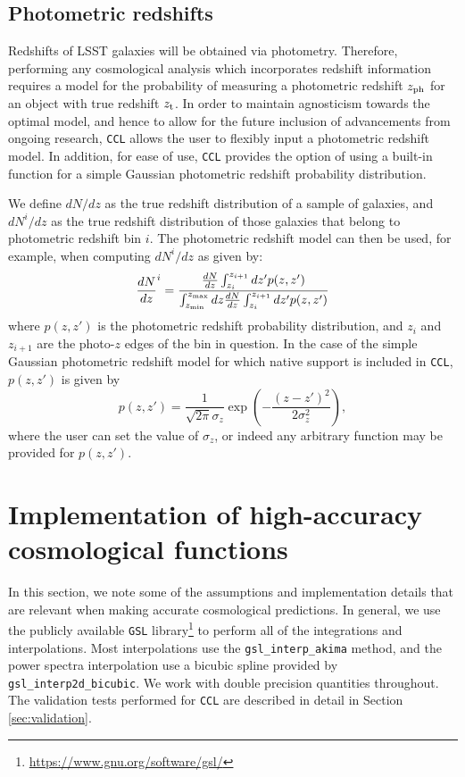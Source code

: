 \documentclass[\docopts]{\docclass}
\newcommand{\ccl}{{\tt CCL}\xspace}
\begin{document}
\subsection{Photometric redshifts}

Redshifts of LSST galaxies will be obtained via photometry. Therefore, performing any cosmological analysis which incorporates redshift information requires a model for the probability of measuring a photometric redshift $z_{\rm ph}$ for an object with true redshift $z_{\rm t}$.  In order to maintain agnosticism towards the optimal model, and hence to allow for the future inclusion of advancements from ongoing research, \ccl allows the user to flexibly input a photometric redshift model. In addition, for ease of use, \ccl provides the option of using a built-in function for a simple Gaussian photometric redshift probability distribution.

We define $dN/dz$ as the true redshift distribution of a sample of galaxies, and $dN^i/dz$ as the true redshift distribution of those galaxies that belong to photometric redshift bin $i$. The photometric redshift model can then be used, for example, when computing $dN^i/dz$ as given by:
\begin{equation}
\frac{dN}{dz}^i = \frac{\frac{dN}{dz}\int_{z_i}^{z_{i+1}} dz' p(z,z')}{\int_{z_{\rm min}}^{z_{\rm max}}dz \frac{dN}{dz} \int_{z_i}^{z_{i+1}}dz' p(z, z')}
\label{photoz}
\end{equation}
where $p(z,z')$ is the photometric redshift probability distribution, and $z_{i}$ and $z_{i+1}$ are the photo-$z$ edges of the bin in question. In the case of the simple Gaussian photometric redshift model for which native support is included in \ccl , $p(z, z')$ is given by
\begin{equation}
p(z,z') = \frac{1}{\sqrt{2 \pi}\sigma_z} \exp\left(-\frac{(z-z')^2}{2\sigma_z^2}\right),
\label{pz_gauss}
\end{equation}
where the user can set the value of $\sigma_z$, or indeed any arbitrary function may be provided for $p(z,z')$.

\section{Implementation of high-accuracy cosmological functions}
\label{sec:implement}

In this section, we note some of the assumptions and implementation details that are relevant when making accurate cosmological predictions. In general, we use the publicly available {\tt GSL} library\footnote{\url{https://www.gnu.org/software/gsl/}} to perform all of the integrations and interpolations. Most interpolations use the {\tt gsl\_interp\_akima} method, and the power spectra interpolation use a bicubic spline provided by {\tt gsl\_interp2d\_bicubic}. We work with double precision quantities throughout. The validation tests performed for {\tt CCL} are described in detail in Section \ref{sec:validation}.
\end{document}
